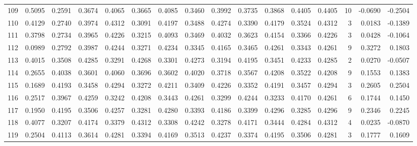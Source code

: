 \begin{tabular}{lrrrrrrrrrrrrrrr}
109 &      0.5095 &  0.2591 &  0.3674 &  0.4065 &  0.3665 &  0.4085 &  0.3460 &  0.3992 &  0.3735 &  0.3868 &   0.4405 &     0.4405 &     10 &                   -0.0690 &                    -0.2504 \\
110 &      0.4129 &  0.2740 &  0.3974 &  0.4312 &  0.3091 &  0.4197 &  0.3488 &  0.4274 &  0.3390 &  0.4179 &   0.3524 &     0.4312 &      3 &                    0.0183 &                    -0.1389 \\
111 &      0.3798 &  0.2734 &  0.3965 &  0.4226 &  0.3215 &  0.4093 &  0.3469 &  0.4032 &  0.3623 &  0.4154 &   0.3366 &     0.4226 &      3 &                    0.0428 &                    -0.1064 \\
112 &      0.0989 &  0.2792 &  0.3987 &  0.4244 &  0.3271 &  0.4234 &  0.3345 &  0.4165 &  0.3465 &  0.4261 &   0.3343 &     0.4261 &      9 &                    0.3272 &                     0.1803 \\
113 &      0.4015 &  0.3508 &  0.4285 &  0.3291 &  0.4268 &  0.3301 &  0.4273 &  0.3194 &  0.4195 &  0.3451 &   0.4233 &     0.4285 &      2 &                    0.0270 &                    -0.0507 \\
114 &      0.2655 &  0.4038 &  0.3601 &  0.4060 &  0.3696 &  0.3602 &  0.4020 &  0.3718 &  0.3567 &  0.4208 &   0.3522 &     0.4208 &      9 &                    0.1553 &                     0.1383 \\
115 &      0.1689 &  0.4193 &  0.3458 &  0.4294 &  0.3272 &  0.4211 &  0.3409 &  0.4226 &  0.3352 &  0.4191 &   0.3457 &     0.4294 &      3 &                    0.2605 &                     0.2504 \\
116 &      0.2517 &  0.3967 &  0.4259 &  0.3242 &  0.4208 &  0.3443 &  0.4261 &  0.3299 &  0.4244 &  0.3233 &   0.4170 &     0.4261 &      6 &                    0.1744 &                     0.1450 \\
117 &      0.1950 &  0.4195 &  0.3506 &  0.4257 &  0.3281 &  0.4280 &  0.3393 &  0.4186 &  0.3399 &  0.4296 &   0.3285 &     0.4296 &      9 &                    0.2346 &                     0.2245 \\
118 &      0.4077 &  0.3207 &  0.4174 &  0.3379 &  0.4312 &  0.3308 &  0.4242 &  0.3278 &  0.4171 &  0.3444 &   0.4284 &     0.4312 &      4 &                    0.0235 &                    -0.0870 \\
119 &      0.2504 &  0.4113 &  0.3614 &  0.4281 &  0.3394 &  0.4169 &  0.3513 &  0.4237 &  0.3374 &  0.4195 &   0.3506 &     0.4281 &      3 &                    0.1777 &                     0.1609 \\

\end{tabular}

